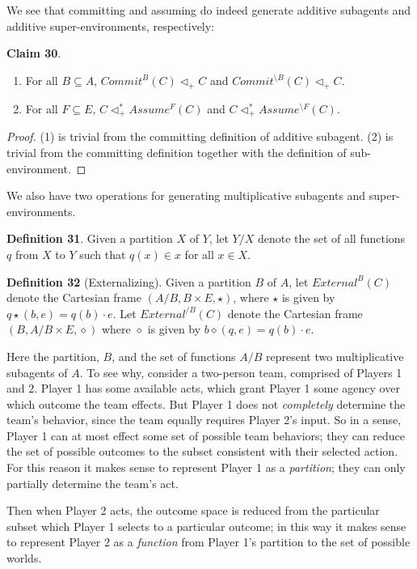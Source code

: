 \documentclass{article}
\begin{document}
We see that committing and assuming do indeed generate additive subagents and additive super-environments, respectively:

\bigskip
\noindent \textbf{Claim 30}.
\begin{enumerate}[label=(\arabic*)]
    \item For all $B \subseteq A$, $Commit^B (C) \triangleleft_+ C$ and  $Commit^{\setminus B} (C) \triangleleft_+ C$.
    \item For all $F \subseteq E$, $C \triangleleft^{*}_+ Assume^F (C)$ and $C \triangleleft^{*}_+ Assume^{\setminus F} (C)$.
\end{enumerate}

\begin{proof}
(1) is trivial from the committing definition of additive subagent.
(2) is trivial from the committing definition together with the definition of sub-environment.
\end{proof}

\noindent We also have two operations for generating multiplicative subagents and super-environments.

\bigskip
\noindent \textbf{Definition 31}.
Given a partition $X$ of $Y$, let $Y/X$ denote the set of all functions $q$ from $X$ to $Y$ such that $q(x) \in x$ for all $x \in X$.

\bigskip
\noindent \textbf{Definition 32} (Externalizing).
Given a partition $B$ of $A$, let $External^B (C)$ denote the Cartesian frame $(A/B, B \times E, \star)$, where $\star$ is given by $q \star (b, e) = q(b) \cdot e$.
Let $External^{/B} (C)$ denote the Cartesian frame $(B, A/B \times E, \diamond)$ where $\diamond$ is given by $b \diamond (q, e) = q(b) \cdot e$.

\bigskip
\noindent Here the partition, $B$, and the set of functions $A/B$ represent two multiplicative subagents of $A$.
To see why, consider a two-person team, comprised of Players 1 and 2.
Player 1 has some available acts, which grant Player 1 some agency over which outcome the team effects.
But Player 1 does not \emph{completely} determine the team's behavior, since the team equally requires Player 2's input.
So in a sense, Player 1 can at most effect some set of possible team behaviors;
they can reduce the set of possible outcomes to the subset consistent with their selected action.
For this reason it makes sense to represent Player 1 as a \emph{partition};
they can only partially determine the team's act.

Then when Player 2 acts, the outcome space is reduced from the particular subset which Player 1 selects to a particular outcome;
in this way it makes sense to represent Player 2 as a \emph{function} from Player 1's partition to the set of possible worlds.
\end{document}
